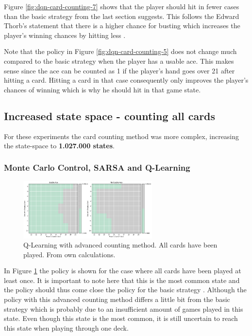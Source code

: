 \documentclass[conference]{IEEEtran}
\begin{document}
Figure \ref{fig:dqn-card-counting-7} shows that the player should hit in fewer cases than the basic strategy from the last section suggests.
This follows the Edward Thorb's statement that there is a higher chance for busting which increases the player's winning chances by hitting less \cite{b1}.

Note that the policy in Figure \ref{fig:dqn-card-counting-5} does not change much compared to the basic strategy when the player has a usable ace. 
This makes sense since the ace can be counted as 1 if the player's hand goes over 21 after hitting a card.
Hitting a card in that case consequently only improves the player's chances of winning which is why he should hit in that game state. 


\subsection{Increased state space - counting all cards}
For these experiments the card counting method was more complex, increasing the state-space to \textbf{1.027.000 states}. 
\subsubsection{Monte Carlo Control, SARSA and Q-Learning}

\begin{figure}
	\centering
	\includegraphics[width=70mm]{figures/Q-Learning/advanced-counting-10-million/policy-all-cards-played-1111111111.png}
	\caption{Q-Learning with advanced counting method. All cards have been played. From own calculations.}
	\label{fig:q-learning-advanced-all-cards-played}
\end{figure}

In Figure \ref{fig:q-learning-advanced-all-cards-played} the policy is shown for the case where all cards have been played at least once.
It is important to note here that this is the most common state and the policy should thus come close the policy for the basic strategy \cite{b1}.
Although the policy with this advanced counting method differs a little bit from the basic strategy which is probably due to an insufficient amount of games played in this state.
Even though this state is the most common, it is still uncertain to reach this state when playing through one deck.
\end{document}
